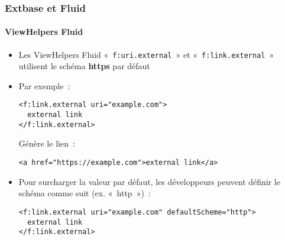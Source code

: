 %

\begin{frame}[fragile]
	\frametitle{Extbase et Fluid}
	\framesubtitle{ViewHelpers Fluid}


	\begin{itemize}
		\item Les ViewHelpers Fluid «~\texttt{f:uri.external}~» et «~\texttt{f:link.external}~»
			utilisent le schéma \textbf{https} par défaut
		\item Par exemple~:
\begin{lstlisting}
<f:link.external uri="example.com">
  external link
</f:link.external>
\end{lstlisting}
			Génère le lien~:
\begin{lstlisting}
<a href="https://example.com">external link</a>
\end{lstlisting}

		\item Pour surcharger la valeur par défaut, les développeurs peuvent définir le
			schéma comme suit (ex. «~http~»)~:
\begin{lstlisting}
<f:link.external uri="example.com" defaultScheme="http">
  external link
</f:link.external>
\end{lstlisting}

	\end{itemize}

\end{frame}

